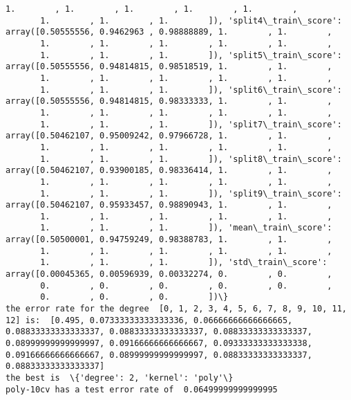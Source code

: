 \documentclass[11pt]{article}
\begin{document}
\begin{Verbatim}[commandchars=\\\{\}]
       1.        , 1.        , 1.        , 1.        , 1.        ,
       1.        , 1.        , 1.        ]), 'split4\_train\_score': array([0.50555556, 0.9462963 , 0.98888889, 1.        , 1.        ,
       1.        , 1.        , 1.        , 1.        , 1.        ,
       1.        , 1.        , 1.        ]), 'split5\_train\_score': array([0.50555556, 0.94814815, 0.98518519, 1.        , 1.        ,
       1.        , 1.        , 1.        , 1.        , 1.        ,
       1.        , 1.        , 1.        ]), 'split6\_train\_score': array([0.50555556, 0.94814815, 0.98333333, 1.        , 1.        ,
       1.        , 1.        , 1.        , 1.        , 1.        ,
       1.        , 1.        , 1.        ]), 'split7\_train\_score': array([0.50462107, 0.95009242, 0.97966728, 1.        , 1.        ,
       1.        , 1.        , 1.        , 1.        , 1.        ,
       1.        , 1.        , 1.        ]), 'split8\_train\_score': array([0.50462107, 0.93900185, 0.98336414, 1.        , 1.        ,
       1.        , 1.        , 1.        , 1.        , 1.        ,
       1.        , 1.        , 1.        ]), 'split9\_train\_score': array([0.50462107, 0.95933457, 0.98890943, 1.        , 1.        ,
       1.        , 1.        , 1.        , 1.        , 1.        ,
       1.        , 1.        , 1.        ]), 'mean\_train\_score': array([0.50500001, 0.94759249, 0.98388783, 1.        , 1.        ,
       1.        , 1.        , 1.        , 1.        , 1.        ,
       1.        , 1.        , 1.        ]), 'std\_train\_score': array([0.00045365, 0.00596939, 0.00332274, 0.        , 0.        ,
       0.        , 0.        , 0.        , 0.        , 0.        ,
       0.        , 0.        , 0.        ])\}
the error rate for the degree  [0, 1, 2, 3, 4, 5, 6, 7, 8, 9, 10, 11, 12] is:  [0.495, 0.07333333333333336, 0.06666666666666665, 0.08833333333333337, 0.08833333333333337, 0.08833333333333337, 0.08999999999999997, 0.09166666666666667, 0.09333333333333338, 0.09166666666666667, 0.08999999999999997, 0.08833333333333337, 0.08833333333333337]
the best is  \{'degree': 2, 'kernel': 'poly'\}
poly-10cv has a test error rate of  0.06499999999999995

    \end{Verbatim}

    \begin{center}
    \end{center}
    { \hspace*{\fill} \\}
    
\end{document}
